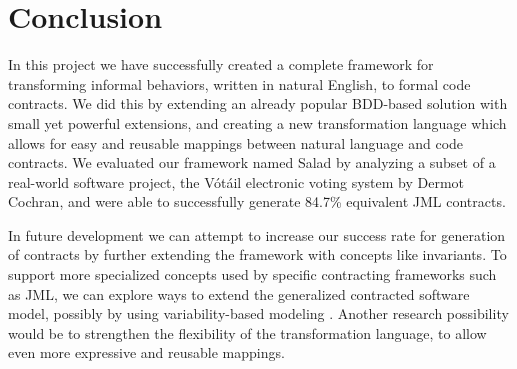 \section{Conclusion}
\label{sec:Conclusion}
In this project we have successfully created a complete framework for transforming informal behaviors, written in natural English, to formal code contracts.
We did this by extending an already popular BDD-based solution with small yet powerful extensions, and creating a new transformation language which
allows for easy and reusable mappings between natural language and code contracts.
We evaluated our framework named Salad by analyzing a subset of a real-world software project, the V\'{o}t\'{a}il electronic voting system by Dermot Cochran, and were able to successfully generate
84.7\% equivalent JML contracts.

In future development we can attempt to increase our success rate for generation of contracts by further extending the framework with concepts like invariants.
To support more specialized concepts used by specific contracting frameworks such as JML,
we can explore ways to extend the generalized contracted software model, possibly by using variability-based modeling \cite{czarnecki2012cool}.
Another research possibility would be to strengthen the flexibility of the transformation language, to allow even more expressive and reusable
mappings.
